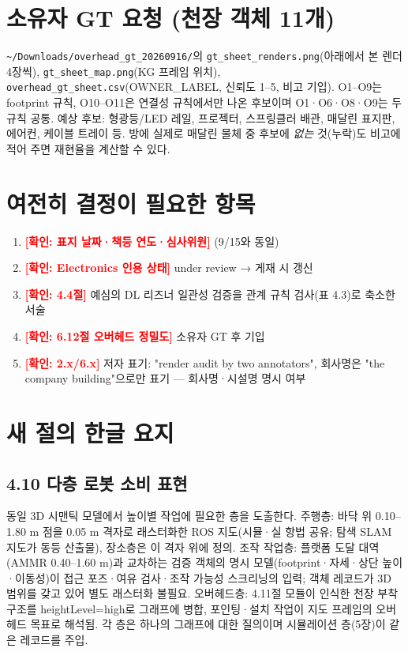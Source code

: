 \documentclass[11pt,a4paper]{article}
\newcommand{\chk}[1]{\textcolor{red}{\textbf{[확인: #1]}}}
\begin{document}
\section*{소유자 GT 요청 (천장 객체 11개)}
\texttt{\textasciitilde/Downloads/overhead\_gt\_20260916/}의 \texttt{gt\_sheet\_renders.png}(아래에서 본 렌더 4장씩), \texttt{gt\_sheet\_map.png}(KG 프레임 위치), \texttt{overhead\_gt\_sheet.csv}(OWNER\_LABEL, 신뢰도 1--5, 비고 기입). O1--O9는 footprint 규칙, O10--O11은 연결성 규칙에서만 나온 후보이며 O1·O6·O8·O9는 두 규칙 공통. 예상 후보: 형광등/LED 레일, 프로젝터, 스프링클러 배관, 매달린 표지판, 에어컨, 케이블 트레이 등. 방에 실제로 매달린 물체 중 후보에 \emph{없는} 것(누락)도 비고에 적어 주면 재현율을 계산할 수 있다.

\section*{여전히 결정이 필요한 항목}
\begin{enumerate}[leftmargin=1.5em]
\item \chk{표지 날짜·책등 연도·심사위원} (9/15와 동일)
\item \chk{Electronics 인용 상태} under review → 게재 시 갱신
\item \chk{4.4절} 예심의 DL 리즈너 일관성 검증을 관계 규칙 검사(표 4.3)로 축소한 서술
\item \chk{6.12절 오버헤드 정밀도} 소유자 GT 후 기입
\item \chk{2.x/6.x} 저자 표기: "render audit by two annotators", 회사명은 "the company building"으로만 표기 — 회사명·시설명 명시 여부
\end{enumerate}

\section*{새 절의 한글 요지}
\subsection*{4.10 다층 로봇 소비 표현}
동일 3D 시맨틱 모델에서 높이별 작업에 필요한 층을 도출한다. 주행층: 바닥 위 0.10--1.80 m 점을 0.05 m 격자로 래스터화한 ROS 지도(시뮬·실 항법 공유; 탐색 SLAM 지도가 동등 산출물), 장소층은 이 격자 위에 정의. 조작 작업층: 플랫폼 도달 대역(AMMR 0.40--1.60 m)과 교차하는 검증 객체의 명시 모델(footprint·자세·상단 높이·이동성)이 접근 포즈·여유 검사·조작 가능성 스크리닝의 입력; 객체 레코드가 3D 범위를 갖고 있어 별도 래스터화 불필요. 오버헤드층: 4.11절 모듈이 인식한 천장 부착 구조를 heightLevel=high로 그래프에 병합, 포인팅·설치 작업이 지도 프레임의 오버헤드 목표로 해석됨. 각 층은 하나의 그래프에 대한 질의이며 시뮬레이션 층(5장)이 같은 레코드를 주입.
\end{document}
